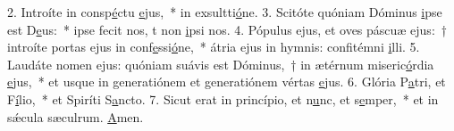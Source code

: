 2. Introíte in consp\uline{é}ctu \uline{e}jus,~* in exsultti\uline{ó}ne.
3. Scitóte quóniam Dóminus \uline{i}pse est D\uline{e}us:~* ipse fecit nos, t non \uline{i}psi nos.
4. Pópulus ejus, et oves páscuæ ejus:~† introíte portas ejus in conf\uline{e}ssi\uline{ó}ne,~* átria ejus in hymnis: confitémni \uline{i}lli.
5. Laudáte nomen ejus: quóniam suávis est Dóminus,~† in ætérnum miseric\uline{ó}rdia \uline{e}jus,~* et usque in generatiónem et generatiónem vértas \uline{e}jus.
6. Glória P\uline{a}tri, et F\uline{í}lio,~* et Spiríti S\uline{a}ncto.
7. Sicut erat in princípio, et n\uline{u}nc, et s\uline{e}mper,~* et in sǽcula sæculrum. \uline{A}men.
